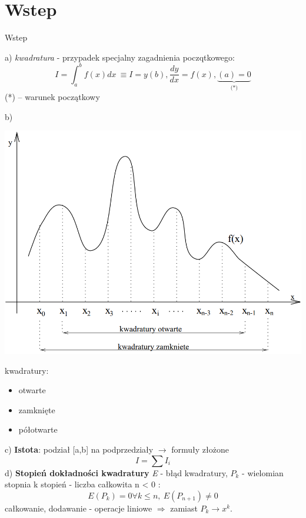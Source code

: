 \section{Wstep}
	\begin{frame}{Wstep} 
    
a) \textit {kwadratura} - przypadek specjalny zagadnienia poczqtkowego:
$$
 I=\int_{a}^{b}f(x)dx\ \equiv I=y(b), \displaystyle \frac{dy}{dx}=f(x) , \underbrace{(a)=0}_\text{(*)}
$$
(*) -- warunek początkowy
	\end{frame}
    \begin{frame}
    
      b)
      \begin{center}
      	\includegraphics[width=0.6\linewidth]{img/6/image001.png}
      \end{center}
      
      \begin{block}{}
      kwadratury:
      
        \begin{itemize}
          \item otwarte
          \item zamknięte
          \item półotwarte
        \end{itemize}
      \end{block}
    \end{frame}
    \begin{frame}
    	c) \textbf{Istota}: podział [a,b] na podprzedziały $\rightarrow$ formuły złożone
        $$
	        I=\sum I_{i}
        $$
		d) \textbf{Stopień dokładności kwadratury} \newline
        \textit{E} - błąd kwadratury, {$P_{k}$} - wielomian stopnia k \newline
        stopień - liczba całkowita n < 0 :
        $$
			E(P_{k})=0 \forall k\leq n,\ E(P_{n+1})\neq 0
		$$
        całkowanie, dodawanie - operacje liniowe $\Rightarrow$ zamiast $P_{k}$$\rightarrow x^{k}.$
    \end{frame}
